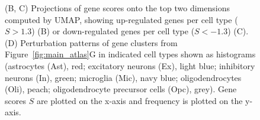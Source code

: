 \begin{figure}[ht]
{        (B, C) Projections of gene scores onto the top two dimensions computed by UMAP, showing up-regulated genes per cell type ($S > 1.3$) (B) or down-regulated genes per cell type ($S < -1.3$) (C). 
        (D) Perturbation patterns of gene clusters from Figure~\ref{fig:main_atlas}G in indicated cell types shown as histograms (astrocytes (Ast), red; excitatory neurons (Ex), light blue; inhibitory neurons (In), green; microglia (Mic), navy blue; oligodendrocytes (Oli), peach; oligodendrocyte precursor cells (Opc), grey). Gene scores $S$ are plotted on the x-axis and frequency is plotted on the y-axis.
    }
    \label{fig:snRNAseq_gene_scores}
\end{figure}